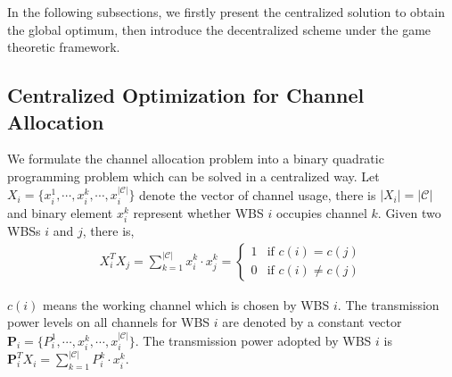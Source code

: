 \documentclass[times]{ettauth}
\theoremstyle{mytheoremstyle}
\theoremstyle{mytheoremstyle}
\theoremstyle{mytheoremstyle}
\renewcommand{\vec}[1]{\mathbf{#1}}
\begin{document}
In the following subsections, we firstly present the centralized solution to obtain the global optimum, then introduce the decentralized scheme under the game theoretic framework.


\subsection{Centralized Optimization for Channel Allocation}
\label{03_centralized_ca}

We formulate the channel allocation problem into a binary quadratic programming problem which can be solved in a centralized way.  
Let $X_i = \{x_i^1,\cdots, x_i^k,\cdots, x_i^{|\mathcal{C}|}\}$ denote the vector of channel usage, there is $|X_i| = |\mathcal{C}|$ and binary element $x_i^k$ represent whether WBS $i$ occupies channel $k$.
Given two WBSs $i$ and $j$, there is,
\begin{equation}
\begin{split}
X_i^TX_j = \sum\limits_{k=1}^{|\mathcal{C}|}x_i^k\cdot x_j^k = 
\left\{ \begin{array}{ll}
1 & \mbox{if $c(i)=c(j)$} \\
0 & \mbox{if $c(i)\neq c(j)$} 
\end{array}
\right.
\end{split}
\end{equation}

$c(i)$ means the working channel which is chosen by WBS $i$.
The transmission power levels on all channels for WBS $i$ are denoted by a constant vector $\vec{P}_i = \{P_i^1,\cdots, x_i^k,\cdots, x_i^{|\mathcal{C}|}\}$. 
The transmission power adopted by WBS $i$ is $\vec{P}_i^TX_i = \sum\limits_{k=1}^{|\mathcal{C}|}P_{i}^k\cdot x_i^k$.
\end{document}
